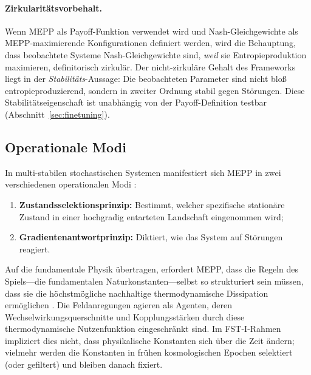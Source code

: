 \documentclass[12pt,a4paper]{article}
\theoremstyle{remark}
\begin{document}
\paragraph{Zirkularit\"atsvorbehalt.} Wenn MEPP als Payoff-Funktion verwendet wird und Nash-Gleichgewichte als MEPP-maximierende Konfigurationen definiert werden, wird die Behauptung, dass beobachtete Systeme Nash-Gleichgewichte sind, \emph{weil} sie Entropieproduktion maximieren, definitorisch zirkul\"ar. Der nicht-zirkul\"are Gehalt des Frameworks liegt in der \emph{Stabilit\"ats}-Aussage: Die beobachteten Parameter sind nicht blo\ss{} entropieproduzierend, sondern in zweiter Ordnung stabil gegen St\"orungen. Diese Stabilit\"atseigenschaft ist unabh\"angig von der Payoff-Definition testbar (Abschnitt~\ref{sec:finetuning}).

\subsection{Operationale Modi}

In multi-stabilen stochastischen Systemen manifestiert sich MEPP in zwei verschiedenen operationalen Modi \citep{MartyushevSeleznev2006}:
\begin{enumerate}
    \item \textbf{Zustandsselektionsprinzip:} Bestimmt, welcher spezifische station\"are Zustand in einer hochgradig entarteten Landschaft eingenommen wird;
    \item \textbf{Gradientenantwortprinzip:} Diktiert, wie das System auf St\"orungen reagiert.
\end{enumerate}

Auf die fundamentale Physik \"ubertragen, erfordert MEPP, dass die Regeln des Spiels---die fundamentalen Naturkonstanten---selbst so strukturiert sein m\"ussen, dass sie die h\"ochstm\"ogliche nachhaltige thermodynamische Dissipation erm\"oglichen \citep{EntropyMaximum}. Die Feldanregungen agieren als Agenten, deren Wechselwirkungsquerschnitte und Kopplungsst\"arken durch diese thermodynamische Nutzenfunktion eingeschr\"ankt sind. Im FST-I-Rahmen impliziert dies nicht, dass physikalische Konstanten sich \"uber die Zeit \"andern; vielmehr werden die Konstanten in fr\"uhen kosmologischen Epochen selektiert (oder gefiltert) und bleiben danach fixiert.
\end{document}
